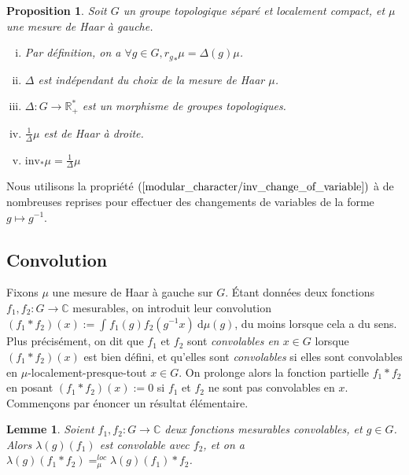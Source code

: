 \documentclass[a4paper,12pt]{article}
\newtheorem{proposition}[theorem]{Proposition}
\newtheorem{lemma}[theorem]{Lemme}
\newcommand{\R}{\mathbb{R}}
\newcommand{\C}{\mathbb{C}}
\newcommand{\integral}[4]{\int_{#1}^{#2} #3~\mathrm{d}#4}
\newcommand{\inv}{^{-1}}
\newcommand{\invop}{\mathrm{inv}}
\begin{document}
\begin{proposition}\label{modular_character}
    Soit $G$ un groupe topologique séparé et localement compact, et $\mu$ une mesure de Haar à gauche.
    \begin{enumerate}[(i)]
        \item\label{modular_character/def} Par définition, on a $\forall g\in G, {r_g}_*\mu = \Delta(g)\mu$.
        \item\label{modular_character/indep} $\Delta$ est indépendant du choix de la mesure de Haar $\mu$.
        \item\label{modular_character/continuous_group_hom} $\Delta:G\to\R_+^*$ est un morphisme de groupes topologiques.
        \item\label{modular_character/right_haar} $\frac{1}{\Delta}\mu$ est de Haar à droite.
        \item\label{modular_character/inv_change_of_variable} $\invop_*\mu = \frac{1}{\Delta}\mu$
    \end{enumerate}
\end{proposition}

Nous utilisons la propriété $(\ref{modular_character/inv_change_of_variable})$ à de nombreuses reprises
pour effectuer des changements de variables de la forme $g\mapsto g\inv$. 

\subsection*{Convolution}

Fixons $\mu$ une mesure de Haar à gauche sur $G$. Étant données deux fonctions $f_1, f_2 : G\to\C$ mesurables, 
on introduit leur convolution $(f_1\ast f_2)(x) := \integral{}{}{f_1(g)f_2(g\inv x)}{\mu(g)}$, du moins lorsque cela a du sens.
Plus précisément, on dit que $f_1$ et $f_2$ sont \emph{convolables en $x\in G$} lorsque $(f_1\ast f_2)(x)$ est bien défini,
et qu'elles sont \emph{convolables} si elles sont convolables en $\mu$-localement-presque-tout $x\in G$.
On prolonge alors la fonction partielle $f_1\ast f_2$ en posant $(f_1\ast f_2)(x) := 0$ si $f_1$ et $f_2$
ne sont pas convolables en $x$. Commençons par énoncer un résultat élémentaire.

\begin{lemma}\label{translate_conv}
    Soient $f_1, f_2 : G\to\C$ deux fonctions mesurables convolables, et $g\in G$. Alors $\lambda(g)(f_1)$ est
    convolable avec $f_2$, et on a $\lambda(g)(f_1\ast f_2) =_{\mu}^{loc} \lambda(g)(f_1)\ast f_2$.
\end{lemma}
\end{document}

